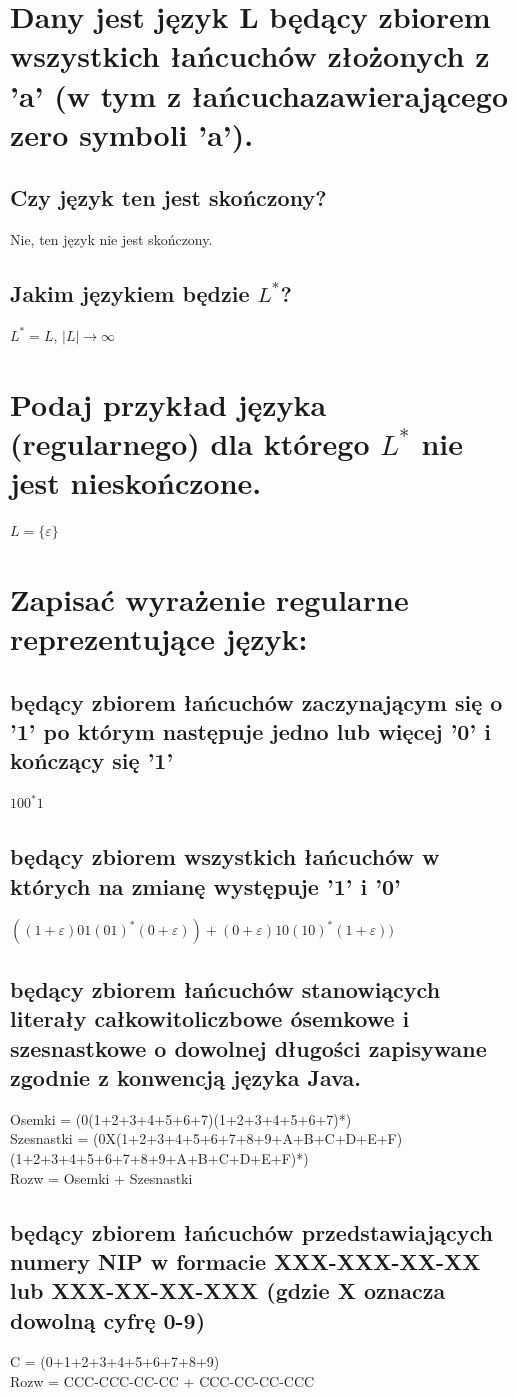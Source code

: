 \documentclass[a4paper,11pt]{article}
\begin{document}
\section{Dany jest język L będący zbiorem wszystkich łańcuchów złożonych z 'a' (w tym z łańcuchazawierającego zero symboli 'a').}
\subsection{Czy język ten jest skończony?}
Nie, ten język nie jest skończony.
\subsection{Jakim językiem będzie $L^*$?}
$L^* = L$, $|L| \rightarrow \infty$

\section{Podaj przykład języka (regularnego) dla którego $L^*$ nie jest nieskończone.}
$L = \{\varepsilon\}$

\newpage
\section{Zapisać wyrażenie regularne reprezentujące język:}
\subsection{będący zbiorem łańcuchów zaczynającym się o '1' po którym następuje jedno lub więcej '0' i kończący się '1'}
$100^*1$
\subsection{będący zbiorem wszystkich łańcuchów w których na zmianę występuje '1' i '0'}
$((1+\varepsilon)01(01)^*(0+\varepsilon)) + (0+\varepsilon)10(10)^*(1+\varepsilon))$
\subsection{będący zbiorem łańcuchów stanowiących literały całkowitoliczbowe ósemkowe i szesnastkowe o dowolnej długości zapisywane zgodnie z konwencją języka Java.}
Osemki = (0(1+2+3+4+5+6+7)(1+2+3+4+5+6+7)*) \\
Szesnastki = (0X(1+2+3+4+5+6+7+8+9+A+B+C+D+E+F)(1+2+3+4+5+6+7+8+9+A+B+C+D+E+F)*) \\
Rozw = Osemki + Szesnastki
\subsection{będący zbiorem łańcuchów przedstawiających numery NIP w formacie XXX-XXX-XX-XX lub XXX-XX-XX-XXX (gdzie X oznacza dowolną cyfrę 0-9)}
C = (0+1+2+3+4+5+6+7+8+9)  \\
Rozw = CCC-CCC-CC-CC + CCC-CC-CC-CCC
\end{document}
